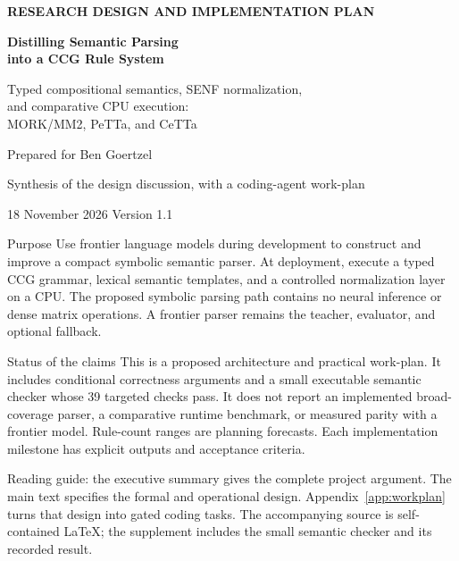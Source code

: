 \documentclass[11pt,a4paper]{article}
\begin{document}
\hypersetup{pageanchor=false}
\begin{titlepage}
\vspace*{12mm}
{\small\bfseries\color{teal}RESEARCH DESIGN AND IMPLEMENTATION PLAN\par}
\vspace{8mm}
{\Huge\bfseries\color{navy}Distilling Semantic Parsing\\[3mm]into a CCG Rule System\par}
\vspace{7mm}
{\Large Typed compositional semantics, SENF normalization,\\[2mm]
and comparative CPU execution:\\[2mm]MORK/MM2, PeTTa, and CeTTa\par}
\vspace{12mm}
{\large Prepared for Ben Goertzel\par}
{\normalsize Synthesis of the design discussion, with a coding-agent work-plan\par}
\vspace{3mm}
{\normalsize 18 November 2026 \quad\textbullet\quad Version 1.1\par}
\vspace{12mm}
\begin{designbox}{Purpose}
Use frontier language models during development to construct and improve a
compact symbolic semantic parser. At deployment, execute a typed CCG grammar,
lexical semantic templates, and a controlled normalization layer on a CPU.
The proposed symbolic parsing path contains no neural inference or dense matrix
operations. A frontier parser remains the teacher, evaluator, and optional
fallback.
\end{designbox}
\vspace{5mm}
\begin{designbox}{Status of the claims}
This is a proposed architecture and practical work-plan. It includes
conditional correctness arguments and a small executable semantic checker
whose 39 targeted checks pass. It does not report an implemented broad-coverage
parser, a comparative runtime benchmark, or measured parity with a frontier model.
Rule-count ranges are planning forecasts. Each implementation milestone has
explicit outputs and acceptance criteria.
\end{designbox}
\vfill
{\small\color{inkgray}Reading guide: the executive summary gives the complete
project argument. The main text specifies the formal and operational design.
Appendix~\ref{app:workplan} turns that design into gated coding tasks.
The accompanying source is self-contained LaTeX; the supplement includes the
small semantic checker and its recorded result.\par}
\end{titlepage}
\hypersetup{pageanchor=true}
\end{document}
